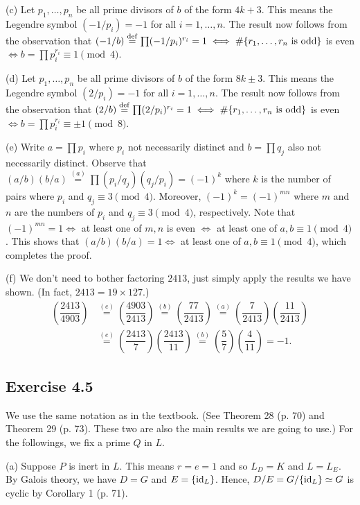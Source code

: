 \documentclass[../Marcus.tex]{subfiles}
\begin{document}
(c) Let $p_1,\ldots,p_n$ be all prime divisors of $b$ of the form $4k+3$. This means the Legendre symbol $(-1/p_i)=-1$ for all $i=1,\ldots,n$. The result now follows from the observation that $(-1/b)\overset{\operatorname{def}}{=}\prod (-1/p_i)^{r_i}=1 \iff \#\{r_1,\ldots,r_n \text{ is odd}\}$ is even $\iff b=\prod p_i^{r_i}\equiv 1\pmod{4}$.

(d) Let $p_1,\ldots,p_n$ be all prime divisors of $b$ of the form $8k\pm3$. This means the Legendre symbol $(2/p_i)=-1$ for all $i=1,\ldots,n$. The result now follows from the observation that $(2/b)\overset{\operatorname{def}}{=}\prod (2/p_i)^{r_i}=1 \iff \#\{r_1,\ldots,r_n \text{ is odd}\}$ is even $\iff b=\prod p_i^{r_i}\equiv \pm1\pmod{8}$.

(e) Write $a=\prod p_i$ where $p_i$ not necessarily distinct and $b=\prod q_j$ also not necessarily distinct. Observe that $(a/b)(b/a)\overset{(a)}{=}\prod (p_i/q_j)(q_j/p_i)=(-1)^k$ where $k$ is the number of pairs where $p_i$ and $q_j\equiv 3\pmod{4}$. Moreover, $(-1)^k=(-1)^{mn}$ where $m$ and $n$ are the numbers of $p_i$ and $q_j\equiv 3\pmod{4}$, respectively. Note that $(-1)^{mn}=1 \iff$ at least one of $m,n$ is even $\iff$ at least one of $a,b\equiv 1\pmod{4}$. This shows that $(a/b)(b/a)=1 \iff$ at least one of $a,b\equiv 1\pmod{4}$, which completes the proof.

(f) We don't need to bother factoring $2413$, just simply apply the results we have shown. (In fact, $2413 = 19\times 127$.)
\begin{align*}
    \left(\dfrac{2413}{4903}\right) &\overset{(e)}{=} \left(\dfrac{4903}{2413}\right) \overset{(b)}{=} \left(\dfrac{77}{2413}\right) \overset{(a)}{=} \left(\dfrac{7}{2413}\right)\left(\dfrac{11}{2413}\right) \\ &\overset{(e)}{=} \left(\dfrac{2413}{7}\right)\left(\dfrac{2413}{11}\right) \overset{(b)}{=} \left(\dfrac{5}{7}\right)\left(\dfrac{4}{11}\right) = -1.
\end{align*}

\subsection*{Exercise 4.5}

We use the same notation as in the textbook. (See Theorem 28 (p. 70) and Theorem 29 (p. 73). These two are also the main results we are going to use.) For the followings, we fix a prime $Q$ in $L$.

(a) Suppose $P$ is inert in $L$. This means $r=e=1$ and so $L_D = K$ and $L=L_E$. By Galois theory, we have $D=G$ and $E = \{\operatorname{id}_L\}$. Hence, $D/E=G/\{\operatorname{id}_L\}\simeq G$ is cyclic by Corollary 1 (p. 71).
\end{document}
